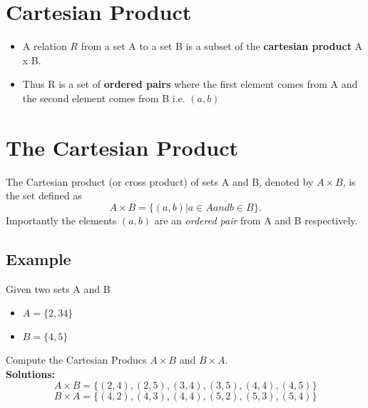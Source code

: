 \documentclass[]{report}
\begin{document}
\section{Cartesian Product}
\begin{itemize}
\item A relation $R$ from a set A to a set B is a subset of the
\textbf{cartesian product} A x B. 
\item Thus R is a set of \textbf{ordered pairs} where
the first element comes from A and the second element comes
from B i.e. $(a, b)$
\end{itemize}

\section*{The Cartesian Product}
The Cartesian product (or cross product) of sets A and B, denoted by
$A \times B$, is the set defined as
\[A \times  B = \{(a, b) | a \in A and b \in B\}.\]
Importantly the elements $(a, b)$ are an \textit{ordered pair} from A and B respectively.
\subsection*{Example}
Given two sets A and B
\begin{itemize}
\item $A = \{2, 3 4\}$
\item $B = \{4, 5\}$
\end{itemize}
Compute the Cartesian Producs $A\times B$ and $B \times A$.\\
\textbf{Solutions:}
\[ A\times B = \{(2, 4),(2, 5),(3, 4),(3, 5),(4, 4),(4, 5)\}\]
\[ B\times A = \{(4, 2),(4, 3),(4, 4),(5, 2),(5, 3),(5, 4)\}\]
\end{document}
